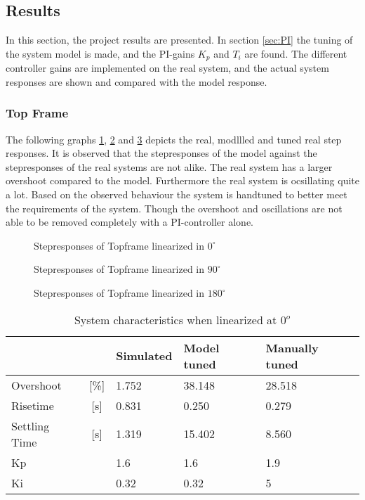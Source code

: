 \documentclass[../../Main]{subfiles}
\begin{document}
\subsection{Results}
\label{sec:results}
In this section, the project results are presented. In section \ref{sec:PI} the tuning of the system model is made, and the PI-gains $K_p$ and $T_i$ are found. The different controller gains are implemented on the real system, and the actual system responses are shown and compared
with the model response.

\subsubsection{Top Frame}
\label{sec:top_frame_results}

The following graphs \ref{fig:top_0}, \ref{fig:top_90} and \ref{fig:top_180} depicts the real, modllled and tuned real step responses.
It is observed that the stepresponses of the model against the stepresponses of the real
systems are not alike. The real system has a larger overshoot compared to the model.
Furthermore the real system is ocsillating quite a lot. Based on the observed behaviour
the system is handtuned to better meet the requirements of the system. Though the
overshoot and oscillations are not able to be removed completely with a PI-controller
alone.


\begin{figure}[H]
  \def\svgwidth{\textwidth}
  
  \caption{Stepresponses of Topframe linearized in $0^{\circ}$}
  \label{fig:top_0}
\end{figure}


\begin{figure}[H]	
  \def\svgwidth{\textwidth}
  
  \caption{Stepresponses of Topframe linearized in $90^{\circ}$}
  \label{fig:top_90}
\end{figure}

\begin{figure}[H]
  \def\svgwidth{\textwidth}
  
  \caption{Stepresponses of Topframe linearized in $180^{\circ}$}
  \label{fig:top_180}
\end{figure}



\begin{table}[H]
	\centering
	\begin{tabular}{lc|*{3}{l}}
		&&Simulated&Model tuned&Manually tuned\\
		\hline
		Overshoot&[\%] &1.752&38.148&28.518\\
		Risetime&[\si{s}]&0.831&0.250&0.279\\
		Settling Time&[\si{s}]&1.319&15.402&8.560\\
		Kp&&1.6&1.6&1.9\\
		Ki&&0.32&0.32&5
	\end{tabular}
	\caption{System characteristics when linearized at $0^o$}
	\label{tab:0_top}
\end{table}
\end{document}
